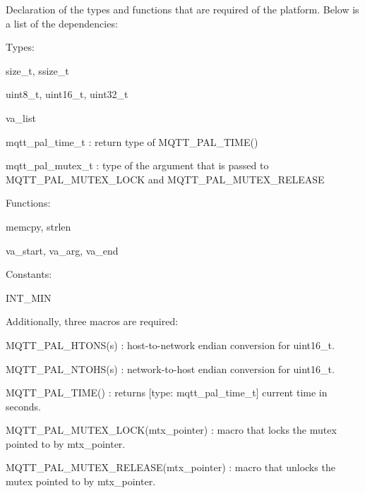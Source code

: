 Declaration of the types and functions that are required of the platform. Below is a list of the dependencies\+:
\begin{DoxyItemize}
\item Types\+:
\begin{DoxyItemize}
\item {\ttfamily size\+\_\+t}, {\ttfamily ssize\+\_\+t} 
\item {\ttfamily uint8\+\_\+t}, {\ttfamily uint16\+\_\+t}, {\ttfamily uint32\+\_\+t} 
\item {\ttfamily va\+\_\+list} 
\item {\ttfamily mqtt\+\_\+pal\+\_\+time\+\_\+t} \+: return type of {\ttfamily M\+Q\+T\+T\+\_\+\+P\+A\+L\+\_\+\+T\+I\+M\+E()} 
\item {\ttfamily mqtt\+\_\+pal\+\_\+mutex\+\_\+t} \+: type of the argument that is passed to {\ttfamily M\+Q\+T\+T\+\_\+\+P\+A\+L\+\_\+\+M\+U\+T\+E\+X\+\_\+\+L\+O\+CK} and {\ttfamily M\+Q\+T\+T\+\_\+\+P\+A\+L\+\_\+\+M\+U\+T\+E\+X\+\_\+\+R\+E\+L\+E\+A\+SE} 
\end{DoxyItemize}
\item Functions\+:
\begin{DoxyItemize}
\item {\ttfamily memcpy}, {\ttfamily strlen} 
\item {\ttfamily va\+\_\+start}, {\ttfamily va\+\_\+arg}, {\ttfamily va\+\_\+end} 
\end{DoxyItemize}
\item Constants\+:
\begin{DoxyItemize}
\item {\ttfamily I\+N\+T\+\_\+\+M\+IN} 
\end{DoxyItemize}
\end{DoxyItemize}

Additionally, three macro\textquotesingle{}s are required\+:
\begin{DoxyItemize}
\item {\ttfamily M\+Q\+T\+T\+\_\+\+P\+A\+L\+\_\+\+H\+T\+O\+N\+S(s)} \+: host-\/to-\/network endian conversion for uint16\+\_\+t.
\item {\ttfamily M\+Q\+T\+T\+\_\+\+P\+A\+L\+\_\+\+N\+T\+O\+H\+S(s)} \+: network-\/to-\/host endian conversion for uint16\+\_\+t.
\item {\ttfamily M\+Q\+T\+T\+\_\+\+P\+A\+L\+\_\+\+T\+I\+M\+E()} \+: returns \mbox{[}type\+: {\ttfamily mqtt\+\_\+pal\+\_\+time\+\_\+t}\mbox{]} current time in seconds.
\item {\ttfamily M\+Q\+T\+T\+\_\+\+P\+A\+L\+\_\+\+M\+U\+T\+E\+X\+\_\+\+L\+O\+C\+K(mtx\+\_\+pointer)} \+: macro that locks the mutex pointed to by {\ttfamily mtx\+\_\+pointer}.
\item {\ttfamily M\+Q\+T\+T\+\_\+\+P\+A\+L\+\_\+\+M\+U\+T\+E\+X\+\_\+\+R\+E\+L\+E\+A\+S\+E(mtx\+\_\+pointer)} \+: macro that unlocks the mutex pointed to by {\ttfamily mtx\+\_\+pointer}.
\end{DoxyItemize}

